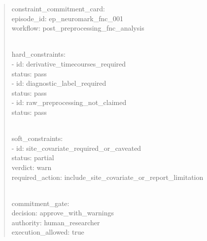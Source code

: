 \begin{quote}
constraint\_\allowbreak{}commitment\_\allowbreak{}card:\\
episode\_\allowbreak{}id: ep\_\allowbreak{}neuromark\_\allowbreak{}fnc\_\allowbreak{}001\\
workflow: post\_\allowbreak{}preprocessing\_\allowbreak{}fnc\_\allowbreak{}analysis\\
\strut \\
hard\_\allowbreak{}constraints:\\
- id: derivative\_\allowbreak{}timecourses\_\allowbreak{}required\\
status: pass\\
- id: diagnostic\_\allowbreak{}label\_\allowbreak{}required\\
status: pass\\
- id: raw\_\allowbreak{}preprocessing\_\allowbreak{}not\_\allowbreak{}claimed\\
status: pass\\
\strut \\
soft\_\allowbreak{}constraints:\\
- id: site\_\allowbreak{}covariate\_\allowbreak{}required\_\allowbreak{}or\_\allowbreak{}caveated\\
status: partial\\
verdict: warn\\
required\_\allowbreak{}action: include\_\allowbreak{}site\_\allowbreak{}covariate\_\allowbreak{}or\_\allowbreak{}report\_\allowbreak{}limitation\\
\strut \\
commitment\_\allowbreak{}gate:\\
decision: approve\_\allowbreak{}with\_\allowbreak{}warnings\\
authority: human\_\allowbreak{}researcher\\
execution\_\allowbreak{}allowed: true
\end{quote}
